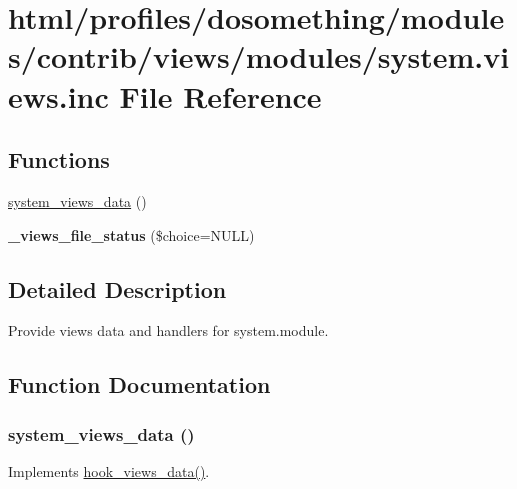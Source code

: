 \hypertarget{system_8views_8inc}{
\section{html/profiles/dosomething/modules/contrib/views/modules/system.views.inc File Reference}
\label{system_8views_8inc}
}
\subsection*{Functions}
\begin{DoxyCompactItemize}
\item 
\hyperlink{system_8views_8inc_a9720aa1df32a1efc1bdaaf6f372c38c3}{system\_\-views\_\-data} ()
\item 
\hypertarget{system_8views_8inc_adbb8ffa6a78abd312f9145c6f2ec3403}{
{\bfseries \_\-views\_\-file\_\-status} (\$choice=NULL)}
\label{system_8views_8inc_adbb8ffa6a78abd312f9145c6f2ec3403}

\end{DoxyCompactItemize}


\subsection{Detailed Description}
Provide views data and handlers for system.module. 

\subsection{Function Documentation}
\hypertarget{system_8views_8inc_a9720aa1df32a1efc1bdaaf6f372c38c3}{
\subsubsection[{system\_\-views\_\-data}]{\setlength{\rightskip}{0pt plus 5cm}system\_\-views\_\-data ()}}
\label{system_8views_8inc_a9720aa1df32a1efc1bdaaf6f372c38c3}
Implements \hyperlink{group__views__hooks_ga227057901681e4a33e33c199c7a8c989}{hook\_\-views\_\-data()}. 
